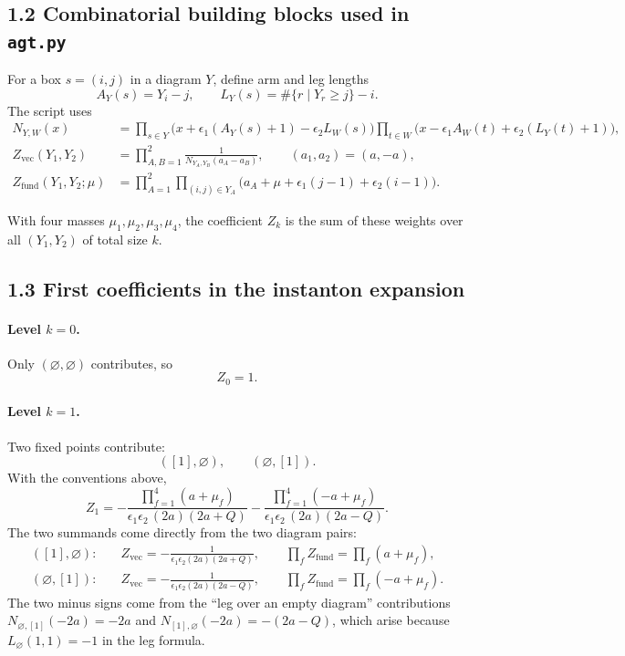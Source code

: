\documentclass[11pt]{article}
\begin{document}
\subsection*{1.2 Combinatorial building blocks used in \texttt{agt.py}}

For a box $s=(i,j)$ in a diagram $Y$, define arm and leg lengths
\[
A_Y(s)=Y_i-j,
\qquad
L_Y(s)=\#\{r\mid Y_r\ge j\}-i.
\]
The script uses
\begin{align*}
N_{Y,W}(x)
&=
\prod_{s\in Y}\bigl(x+\epsilon_1(A_Y(s)+1)-\epsilon_2 L_W(s)\bigr)
\prod_{t\in W}\bigl(x-\epsilon_1 A_W(t)+\epsilon_2(L_Y(t)+1)\bigr),\\
Z_{\mathrm{vec}}(Y_1,Y_2)
&=
\prod_{A,B=1}^2
\frac{1}{N_{Y_A,Y_B}(a_A-a_B)},
\qquad (a_1,a_2)=(a,-a),\\
Z_{\mathrm{fund}}(Y_1,Y_2;\mu)
&=
\prod_{A=1}^2\prod_{(i,j)\in Y_A}
\bigl(a_A+\mu+\epsilon_1(j-1)+\epsilon_2(i-1)\bigr).
\end{align*}

With four masses $\mu_1,\mu_2,\mu_3,\mu_4$, the coefficient $Z_k$ is the sum of these weights over all $(Y_1,Y_2)$ of total size $k$.

\subsection*{1.3 First coefficients in the instanton expansion}

\paragraph{Level $k=0$.}
Only $(\varnothing,\varnothing)$ contributes, so
\[
Z_0=1.
\]

\paragraph{Level $k=1$.}
Two fixed points contribute:
\[
([1],\varnothing),\qquad (\varnothing,[1]).
\]
With the conventions above,
\[
Z_1
=
-\frac{\prod_{f=1}^4(a+\mu_f)}{\epsilon_1\epsilon_2\,(2a)(2a+Q)}
-\frac{\prod_{f=1}^4(-a+\mu_f)}{\epsilon_1\epsilon_2\,(2a)(2a-Q)}.
\]
The two summands come directly from the two diagram pairs:
\begin{align*}
([1],\varnothing):\quad&
Z_{\mathrm{vec}}=-\frac{1}{\epsilon_1\epsilon_2(2a)(2a+Q)},\qquad
\prod_f Z_{\mathrm{fund}}=\prod_f(a+\mu_f),\\
(\varnothing,[1]):\quad&
Z_{\mathrm{vec}}=-\frac{1}{\epsilon_1\epsilon_2(2a)(2a-Q)},\qquad
\prod_f Z_{\mathrm{fund}}=\prod_f(-a+\mu_f).
\end{align*}
The two minus signs come from the ``leg over an empty diagram''
contributions $N_{\varnothing,[1]}(-2a)=-2a$ and $N_{[1],\varnothing}(-2a)=-(2a-Q)$,
which arise because $L_\varnothing(1,1)=-1$ in the leg formula.
\end{document}
